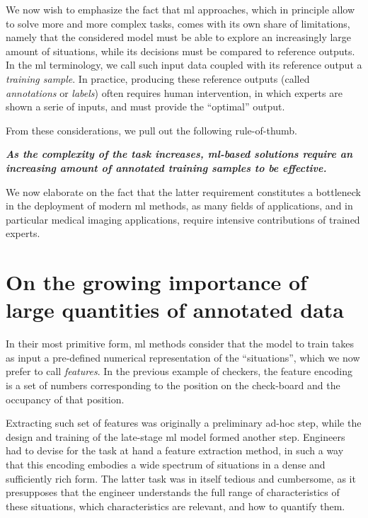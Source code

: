 We now wish to emphasize the fact that \gls{ml} approaches, which in principle allow to solve more and more complex tasks, comes with its own share of limitations, namely that the considered model must be able to explore an increasingly large amount of situations, while its decisions must be compared to reference outputs.
In the \gls{ml} terminology, we call such input data coupled with its reference output a \textit{training sample}.
In practice, producing these reference outputs (called \textit{annotations} or \textit{labels}) often requires human intervention, in which experts
are shown a serie of inputs, and must provide the ``optimal'' output.

From these considerations, we pull out the following rule-of-thumb.

\textbf{\textit{As the complexity of the task increases, \gls{ml}-based solutions require an increasing amount of annotated training samples to be effective.}}

We now elaborate on the fact that the latter requirement constitutes a bottleneck in the deployment of modern \gls{ml} methods, as many fields of applications, and in particular medical imaging applications, require intensive contributions of trained experts.

\section{On the growing importance of large quantities of annotated data}
In their most primitive form, \gls{ml} methods consider that the model to train takes as input a pre-defined numerical representation of the ``situations'', which we now prefer to call \textit{features}.
In the previous example of checkers, the feature encoding is a set of numbers corresponding to the position on the check-board and the occupancy of that position.

Extracting such set of features was originally a preliminary ad-hoc step, while the design and training of the late-stage \gls{ml} model formed another step.
Engineers had to devise for the task at hand a feature extraction method, in such a way that this encoding embodies a wide spectrum of situations in a dense and sufficiently rich form.
The latter task was in itself tedious and cumbersome, as it presupposes that the engineer understands the full range of characteristics of these situations, which characteristics are relevant, and how to quantify them.

